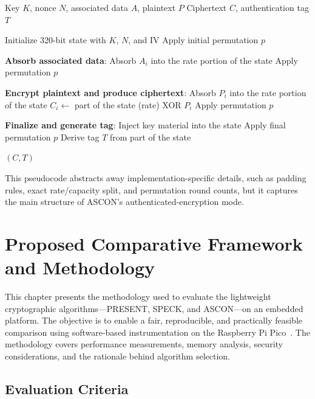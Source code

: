 \documentclass[12pt]{report}
\begin{document}
\begin{algorithm}[H]
    \caption{ASCON AEAD Encryption (High-Level)}
    \label{alg:ascon-aead}
    \begin{algorithmic}[1]
        \REQUIRE Key $K$, nonce $N$, associated data $A$, plaintext $P$
        \ENSURE Ciphertext $C$, authentication tag $T$

        \STATE Initialize 320-bit state with $K$, $N$, and IV
        \STATE Apply initial permutation $p$

        \STATE \textbf{Absorb associated data}:
        \STATE Absorb $A_i$ into the rate portion of the state
        \STATE Apply permutation $p$
        \ENDFOR

        \STATE \textbf{Encrypt plaintext and produce ciphertext}:
        \STATE Absorb $P_i$ into the rate portion of the state
        \STATE $C_i \gets$ part of the state (rate) XOR $P_i$
        \STATE Apply permutation $p$
        \ENDFOR

        \STATE \textbf{Finalize and generate tag}:
        \STATE Inject key material into the state
        \STATE Apply final permutation $p$
        \STATE Derive tag $T$ from part of the state

        \RETURN $(C, T)$
    \end{algorithmic}
\end{algorithm}

This pseudocode abstracts away implementation-specific details, such as padding rules, exact
rate/capacity split, and permutation round counts, but it captures the main structure of ASCON’s
authenticated-encryption mode.

\chapter{Proposed Comparative Framework and Methodology}

This chapter presents the methodology used to evaluate the lightweight cryptographic
algorithms—PRESENT, SPECK, and ASCON—on an embedded platform. The objective is to enable a
fair, reproducible, and practically feasible comparison using software-based instrumentation
on the Raspberry Pi Pico~\cite{raspberry2021pico}. The methodology covers performance
measurements, memory analysis, security considerations, and the rationale behind algorithm selection.

\section{Evaluation Criteria}
\end{document}

